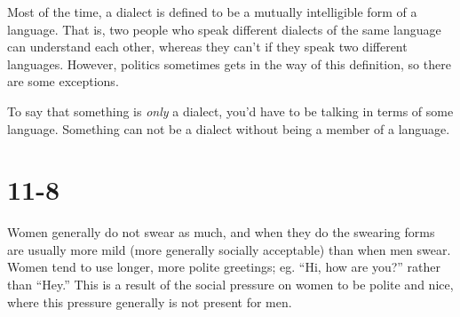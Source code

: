 \documentclass[12pt]{article}
\begin{document}
Most of the time, a dialect is defined to be a mutually intelligible
form of a language.  That is, two people who speak different dialects of
the same language can understand each other, whereas they can't if they
speak two different languages.  However, politics sometimes gets in the
way of this definition, so there are some exceptions.

To say that something is \textit{only} a dialect, you'd have to be
talking in terms of some language.  Something can not be a dialect
without being a member of a language.

\section*{11-8}

Women generally do not swear as much, and when they do the swearing
forms are usually more mild (more generally socially acceptable) than
when men swear.  Women tend to use longer, more polite greetings; eg.
``Hi, how are you?'' rather than ``Hey.''  This is a result of the
social pressure on women to be polite and nice, where this pressure
generally is not present for men.
\end{document}
